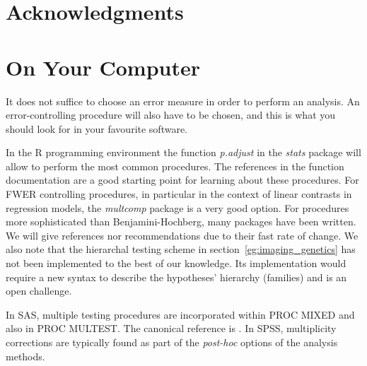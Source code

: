 \documentclass[draft,12pt]{article}
\begin{document}
\section{Acknowledgments}



\appendix

\section{\label{sec:on_your_pc} On Your Computer}
It does not suffice to choose an error measure in order to perform an analysis. An error-controlling procedure will also have to be chosen, and this is what you should look for in your favourite software. 

In the R programming environment \citep{r_development_core_team_r:_2011} the function \emph{p.adjust} in the \emph{stats} package will allow to perform the most common procedures. The references in the function documentation are a good starting point for learning about these procedures. For FWER controlling procedures, in particular in the context of linear contrasts in regression models, the \emph{multcomp} package is a very good option. For procedures more sophisticated than Benjamini-Hochberg, many packages have been written. We will give references nor recommendations due to their fast rate of change. 
We also note that the hierarchal testing scheme in section~\ref{eg:imaging_genetics} has not been implemented to the best of our knowledge. Its implementation would require a new syntax to describe the hypotheses' hierarchy (families) and is an open challenge. 

In SAS, multiple testing procedures are incorporated within PROC MIXED and also in PROC MULTEST.  The canonical reference is \citet{westfall_multiple_2011}. In SPSS, multiplicity corrections are typically found as part of the \emph{post-hoc} options of the analysis methods.





\end{document}
